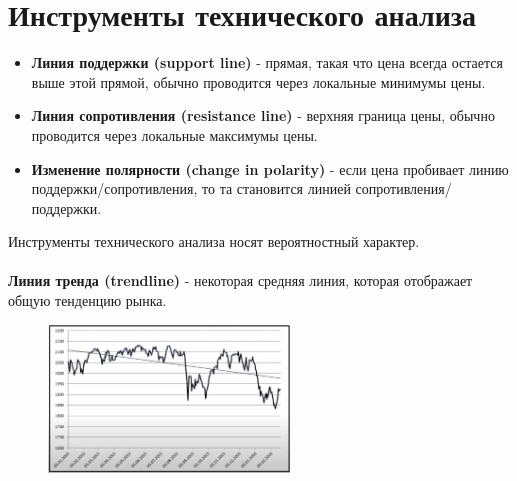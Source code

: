 \documentclass{article}
\begin{document}
\section{Инструменты технического анализа}
\begin{itemize}
    \item \textbf{Линия поддержки (support line)} - прямая, такая что цена всегда остается выше этой прямой, обычно проводится через локальные минимумы цены.

    \item \textbf{Линия сопротивления (resistance line)} - верхняя граница цены, обычно проводится через локальные максимумы цены.

    \item \textbf{Изменение полярности (change in polarity)} - если цена пробивает линию поддержки/сопротивления, то та становится линией сопротивления/поддержки.
\end{itemize}
Инструменты технического анализа носят вероятностный характер.\\\\
\textbf{Линия тренда (trendline)} - некоторая средняя линия, которая отображает общую тенденцию рынка.
\begin{figure}[h]
\centering
\includegraphics[width=0.57\textwidth]{trendline.png}
\label{loadings}
\end{figure}

\newpage
\end{document}

